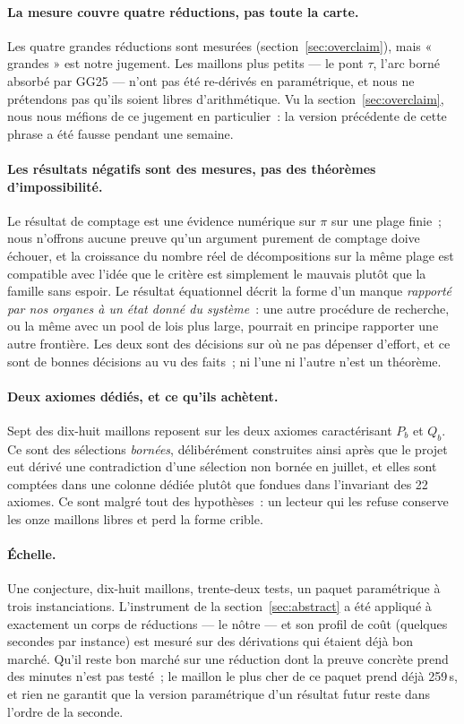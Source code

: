 \documentclass[11pt]{article}
\theoremstyle{remark}\newtheorem{remarque}{Remarque}
\begin{document}
\paragraph{La mesure couvre quatre réductions, pas toute la carte.} Les quatre grandes
réductions sont mesurées (section~\ref{sec:overclaim}), mais « grandes » est notre
jugement. Les maillons plus petits --- le pont $\tau$, l'arc borné absorbé par GG25 ---
n'ont pas été re-dérivés en paramétrique, et nous ne prétendons pas qu'ils soient libres
d'arithmétique. Vu la section~\ref{sec:overclaim}, nous nous méfions de ce jugement en
particulier~: la version précédente de cette phrase a été fausse pendant une semaine.

\paragraph{Les résultats négatifs sont des mesures, pas des théorèmes d'impossibilité.}
Le résultat de comptage est une évidence numérique sur $\pi$ sur une plage finie~; nous
n'offrons aucune preuve qu'un argument purement de comptage doive échouer, et la
croissance du nombre réel de décompositions sur la même plage est compatible avec l'idée
que le critère est simplement le mauvais plutôt que la famille sans espoir. Le résultat
équationnel décrit la forme d'un manque \emph{rapporté par nos organes à un état donné du
système}~: une autre procédure de recherche, ou la même avec un pool de lois plus large,
pourrait en principe rapporter une autre frontière. Les deux sont des décisions sur où ne
pas dépenser d'effort, et ce sont de bonnes décisions au vu des faits~; ni l'une ni
l'autre n'est un théorème.

\paragraph{Deux axiomes dédiés, et ce qu'ils achètent.} Sept des dix-huit maillons
reposent sur les deux axiomes caractérisant $P_b$ et $Q_b$. Ce sont des sélections
\emph{bornées}, délibérément construites ainsi après que le projet eut dérivé une
contradiction d'une sélection non bornée en juillet, et elles sont comptées dans une
colonne dédiée plutôt que fondues dans l'invariant des 22 axiomes. Ce sont malgré tout des
hypothèses~: un lecteur qui les refuse conserve les onze maillons libres et perd la forme
crible.

\paragraph{Échelle.} Une conjecture, dix-huit maillons, trente-deux tests, un paquet
paramétrique à trois instanciations. L'instrument de la section~\ref{sec:abstract} a été
appliqué à exactement un corps de réductions --- le nôtre --- et son profil de coût
(quelques secondes par instance) est mesuré sur des dérivations qui étaient déjà bon
marché. Qu'il reste bon marché sur une réduction dont la preuve concrète prend des
minutes n'est pas testé~; le maillon le plus cher de ce paquet prend déjà 259\,s, et rien
ne garantit que la version paramétrique d'un résultat futur reste dans l'ordre de la
seconde.
\end{document}
